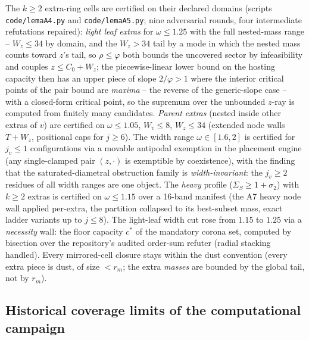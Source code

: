\documentclass[11pt]{article}
\theoremstyle{definition}
\begin{document}
The $k\ge2$ extra-ring cells are certified on their declared
domains (scripts \texttt{code/lemaA4.py} and
\texttt{code/lemaA5.py}; nine adversarial rounds, four
intermediate refutations repaired): \emph{light leaf extras} for
$\omega\le1.25$ with the full nested-mass range -- $W_z\le34$ by
domain, and the $W_z>34$ tail by a mode in which the nested mass
counts toward $z$'s tail, so $\rho\le\varphi$ both bounds the
uncovered sector by infeasibility and couples $z\le C_0+W_z$; the
piecewise-linear lower bound on the hosting capacity then has an
upper piece of slope $2/\varphi>1$ where the interior critical
points of the pair bound are \emph{maxima} -- the reverse of the
generic-slope case -- with a closed-form critical point, so the
supremum over the unbounded $z$-ray is computed from finitely many
candidates. \emph{Parent extras} (nested inside other extras of
$v$) are certified on $\omega\le1.05$, $W_v\le8$, $W_z\le34$
(extended node walls $T+W_z$, positional caps for $j\ge6$). The
width range $\omega\in[1.6,2]$ is certified for $j_v\le1$
configurations via a movable antipodal exemption in the placement
engine (any single-clamped pair $(z,\cdot)$ is exemptible by
coexistence), with the finding that the saturated-diametral
obstruction family is \emph{width-invariant}: the $j_v\ge2$
residues of all width ranges are one object. The \emph{heavy}
profile ($\Sigma_S\ge1+\sigma_2$) with $k\ge2$ extras is
certified on $\omega\le1.15$ over a 16-band manifest (the A7
heavy node wall applied per-extra, the partition collapsed to its
best-subset mass, exact ladder variants up to $j\le8$). The
light-leaf width cut rose from $1.15$ to $1.25$ via a
\emph{necessity} wall: the floor capacity $c^*$ of the mandatory
corona set, computed by bisection over the repository's audited
order-sum refuter (radial stacking handled). Every mirrored-cell
closure stays within the dust convention (every extra piece is
dust, of size $<r_m$; the extra \emph{masses} are bounded by the
global tail, not by $r_m$).

\subsection*{Historical coverage limits of the computational campaign}
\end{document}
